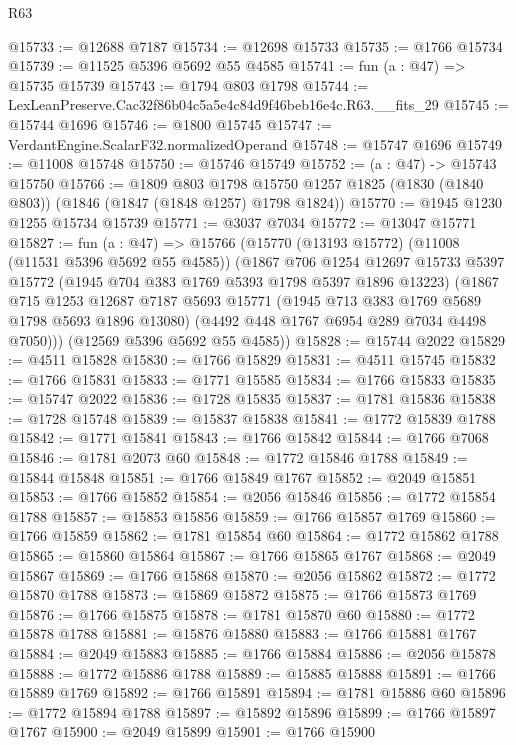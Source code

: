 \begin{lexlean}{R63}
\begin{coremodule}
@15733 := @12688 @7187
@15734 := @12698 @15733
@15735 := @1766 @15734
@15739 := @11525 @5396 @5692 @55 @4585
@15741 := fun (a : @47) => @15735 @15739
@15743 := @1794 @803 @1798
@15744 := LexLeanPreserve.Cac32f86b04c5a5e4c84d9f46beb16e4c.R63.__fits_29
@15745 := @15744 @1696
@15746 := @1800 @15745
@15747 := VerdantEngine.ScalarF32.normalizedOperand
@15748 := @15747 @1696
@15749 := @11008 @15748
@15750 := @15746 @15749
@15752 := (a : @47) -> @15743 @15750
@15766 := @1809
    @803
    @1798
    @15750
    @1257
    @1825
    (@1830 (@1840 @803))
    (@1846 (@1847 (@1848 @1257) @1798 @1824))
@15770 := @1945 @1230 @1255 @15734 @15739
@15771 := @3037 @7034
@15772 := @13047 @15771
@15827 := fun (a : @47) =>
  @15766
    (@15770
      (@13193 @15772)
      (@11008 (@11531 @5396 @5692 @55 @4585))
      (@1867
        @706
        @1254
        @12697
        @15733
        @5397
        @15772
        (@1945 @704 @383 @1769 @5393 @1798 @5397 @1896 @13223)
        (@1867
          @715
          @1253
          @12687
          @7187
          @5693
          @15771
          (@1945 @713 @383 @1769 @5689 @1798 @5693 @1896 @13080)
          (@4492 @448 @1767 @6954 @289 @7034 @4498 @7050)))
      (@12569 @5396 @5692 @55 @4585))
@15828 := @15744 @2022
@15829 := @4511 @15828
@15830 := @1766 @15829
@15831 := @4511 @15745
@15832 := @1766 @15831
@15833 := @1771 @15585
@15834 := @1766 @15833
@15835 := @15747 @2022
@15836 := @1728 @15835
@15837 := @1781 @15836
@15838 := @1728 @15748
@15839 := @15837 @15838
@15841 := @1772 @15839 @1788
@15842 := @1771 @15841
@15843 := @1766 @15842
@15844 := @1766 @7068
@15846 := @1781 @2073 @60
@15848 := @1772 @15846 @1788
@15849 := @15844 @15848
@15851 := @1766 @15849 @1767
@15852 := @2049 @15851
@15853 := @1766 @15852
@15854 := @2056 @15846
@15856 := @1772 @15854 @1788
@15857 := @15853 @15856
@15859 := @1766 @15857 @1769
@15860 := @1766 @15859
@15862 := @1781 @15854 @60
@15864 := @1772 @15862 @1788
@15865 := @15860 @15864
@15867 := @1766 @15865 @1767
@15868 := @2049 @15867
@15869 := @1766 @15868
@15870 := @2056 @15862
@15872 := @1772 @15870 @1788
@15873 := @15869 @15872
@15875 := @1766 @15873 @1769
@15876 := @1766 @15875
@15878 := @1781 @15870 @60
@15880 := @1772 @15878 @1788
@15881 := @15876 @15880
@15883 := @1766 @15881 @1767
@15884 := @2049 @15883
@15885 := @1766 @15884
@15886 := @2056 @15878
@15888 := @1772 @15886 @1788
@15889 := @15885 @15888
@15891 := @1766 @15889 @1769
@15892 := @1766 @15891
@15894 := @1781 @15886 @60
@15896 := @1772 @15894 @1788
@15897 := @15892 @15896
@15899 := @1766 @15897 @1767
@15900 := @2049 @15899
@15901 := @1766 @15900

\end{coremodule}
\end{lexlean}
